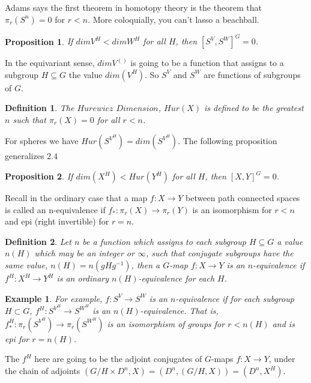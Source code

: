 \documentclass{article}
\theoremstyle{problemstyle}
\theoremstyle{problemstyle}
\newtheorem{definition}{Definition}
\theoremstyle{problemstyle}
\newtheorem{example}{Example}
\theoremstyle{problemstyle}
\theoremstyle{problemstyle}
\newtheorem{proposition}{Proposition}
\theoremstyle{problemstyle}
\begin{document}
Adams says the first theorem in homotopy theory is the theorem that $\pi_r(S^n) = 0$ for $r <n$. More coloquially, you can't lasso a beachball.

\begin{proposition}
If $dim V^H  <  dim W^H$ for all $H$, then $[S^V,S^W]^G=0$.
\end{proposition}

In the equivariant sense, $dim V^{()}$ is going to be a function that assigns to a subgroup $H \subseteq G$ the value $dim(V^H)$. So $S^V$ and $S^W$ are functions of subgroups of $G$. 

\begin{definition}
The $Hurewicz$ $Dimension$, $Hur(X)$ is defined to be the greatest $n$ such that $\pi_r(X) = 0$ for all $r < n$. 
\end{definition}

For spheres we have $Hur(S^{V^H}) = dim(S^{V^H})$. The following proposition generalizes $2.4$

\begin{proposition}
If $dim(X^H)  <  Hur(Y^H)$ for all $H$, then $[X,Y]^G=0$.
\end{proposition}

Recall in the ordinary case that a map $f:X\rightarrow Y$ between path connected spaces is called an n-equivalence if $f_*:\pi_r(X)\rightarrow \pi_r(Y)$ is an isomorphism for $r < n$ and epi (right invertible) for $r=n$. 

\begin{definition}
Let $n$ be a function which assigns to each subgroup $H\subseteq G$ a value $n(H)$ which may be an integer or $\infty$, such that conjugate subgroups have the same value, $n(H) = n(gHg^{-1})$, then a $G$-map $f:X \rightarrow Y$ is an $n$-equivalence if $f^H:X^H\rightarrow Y^H$ is an ordinary $n(H)$-equivalence for each $H$.
\end{definition}

\begin{example}
For example, $f:S^V \rightarrow S^W$ is an $n$-equivalence if for each subgroup $H \subset G$, $f^H:S^{V^H} \rightarrow S^{W^H}$ is an $n(H)$-equivalence. That is, $f^H_*:\pi_r(S^{V^H}) \rightarrow \pi_r(S^{W^H})$ is an isomorphism of groups for $r < n(H)$ and is epi for $r = n(H)$. 
\end{example}


The $f^H$ here are going to be the adjoint conjugates of $G$-maps $f:X \rightarrow Y$, under the chain of adjoints $(G/H \times D^n, X) = (D^n, (G/H,X)) = (D^n, X^H)$. 
\end{document}
